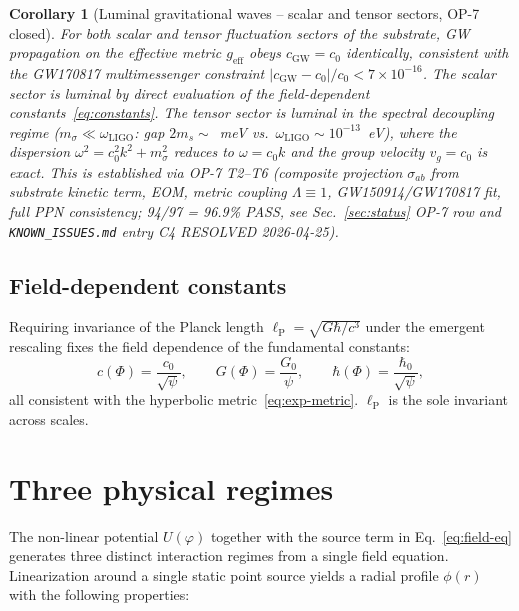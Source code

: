\documentclass[11pt,a4paper]{article}
\renewcommand{\Phi}{\varPhi}
\newcommand{\lP}{\ell_{\mathrm{P}}}
\newtheorem{corollary}[axiom]{Corollary}
\begin{document}
\begin{corollary}[Luminal gravitational waves -- scalar and tensor
sectors, OP-7 closed]\label{cor:cGW}
For both scalar and tensor fluctuation sectors of the substrate,
GW propagation on the effective metric $g_{\mathrm{eff}}$ obeys
$c_{\mathrm{GW}} = c_0$ identically, consistent with the GW170817
multimessenger constraint $|c_{\mathrm{GW}} - c_0|/c_0 < 7 \times 10^{-16}$.
The scalar sector is luminal by direct evaluation of the field-dependent
constants~\eqref{eq:constants}. The tensor sector is luminal in the
\emph{spectral decoupling regime} ($m_\sigma \ll \omega_{\mathrm{LIGO}}$:
gap $2 m_s \sim$~meV vs.\ $\omega_{\mathrm{LIGO}} \sim 10^{-13}$~eV),
where the dispersion $\omega^2 = c_0^2 k^2 + m_\sigma^2$ reduces to
$\omega = c_0 k$ and the group velocity $v_g = c_0$ is exact.
This is established via OP-7 T2--T6 (composite projection
$\sigma_{ab}$ from substrate kinetic term, EOM, metric coupling
$\Lambda \equiv 1$, GW150914/GW170817 fit, full PPN consistency;
94/97 = 96.9\% PASS, see Sec.~\ref{sec:status} OP-7 row and
\texttt{KNOWN\_ISSUES.md} entry C4 RESOLVED 2026-04-25).
\end{corollary}

\subsection{Field-dependent constants}

Requiring invariance of the Planck length $\lP=\sqrt{G\hbar/c^{3}}$
under the emergent rescaling fixes the field dependence of the
fundamental constants:
\begin{equation}\label{eq:constants}
  c(\Phi)=\frac{c_{0}}{\sqrt{\psi}},
  \qquad
  G(\Phi)=\frac{G_{0}}{\psi},
  \qquad
  \hbar(\Phi)=\frac{\hbar_{0}}{\sqrt{\psi}},
\end{equation}
all consistent with the hyperbolic metric~\eqref{eq:exp-metric}. $\lP$
is the sole invariant across scales.

\section{Three physical regimes}\label{sec:regimes}

The non-linear potential $U(\varphi)$ together with the source term in
Eq.~\eqref{eq:field-eq} generates three distinct interaction regimes from a
single field equation. Linearization around a single static point source
yields a radial profile $\phi(r)$ with the following properties:
\end{document}
